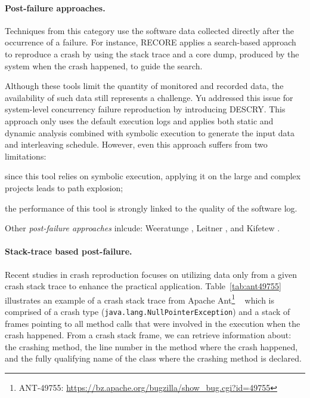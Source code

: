 \paragraph{Post-failure approaches.}

Techniques from this category use the software data collected directly after the occurrence of a failure. For instance, \textrm{RECORE} \cite{Rossler2013} applies a search-based approach to reproduce a crash by using the stack trace and a core dump, produced by the system when the crash happened, to guide the search.

Although these tools limit the quantity of monitored and recorded data, the availability of such data still represents a challenge. 
Yu \etal \cite{YZW17descry} addressed this issue for system-level concurrency failure reproduction by introducing \textrm{DESCRY}. 
This approach only uses the default execution logs and applies both static and dynamic analysis combined with symbolic execution to generate the input data and interleaving schedule. 
However, even this approach suffers from two limitations: 
\begin{inparaenum}[(i)]
\item since this tool relies on symbolic execution, applying it on the large and complex projects leads to path explosion;
\item the performance of this tool is strongly linked to the quality of the software log.
\end{inparaenum}
%
Other \textit{post-failure approaches} inlcude: Weeratunge \etal \cite{Weeratunge2010}, Leitner \etal \cite{Leitner2007, Leitner2009}, and Kifetew \etal \cite{Kifetew2013, Kifetew2014}.

\paragraph{Stack-trace based post-failure.}

Recent studies in crash reproduction \cite{BPT17concrash,soltani2017,Nayrolles2017,Xuan2015,Chen2015} focuses on utilizing data only from a given crash stack trace to enhance the practical application. 
%
Table~\ref{tab:ant49755} illustrates an example of a crash stack trace from Apache Ant\footnote{ANT-49755: \url{https://bz.apache.org/bugzilla/show_bug.cgi?id=49755} } ~\cite{ant} which is comprised of a crash type (\texttt{java.lang.Null\-Pointer\-Exception}) and a stack of frames pointing to all method calls that were involved in the execution when the crash happened.
From a crash stack frame, we can retrieve information about: the crashing method, the line number in the method where the crash happened, and the fully qualifying name of the class where the crashing method is declared.

